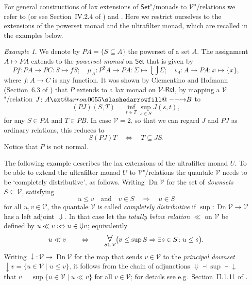 \documentclass[preprint, a4paper]{elsarticle}
\makeatletter
\def\slashedarrowfill@#1#2#3#4#5{%
  $\m@th\thickmuskip0mu\medmuskip\thickmuskip\thinmuskip\thickmuskip
   \relax#5#1\mkern-7mu%
   \cleaders\hbox{$#5\mkern-2mu#2\mkern-2mu$}\hfill
   \mathclap{#3}\mathclap{#2}%
   \cleaders\hbox{$#5\mkern-2mu#2\mkern-2mu$}\hfill
   \mkern-7mu#4$%
}
\def\rightslashedarrowfill@{%
  \slashedarrowfill@\relbar\relbar\mapstochar\rightarrow}
\newcommand\xslashedrightarrow[2][]{%
  \ext@arrow 0055{\rightslashedarrowfill@}{#1}{#2}}
\def\slashedrightarrow{\xslashedrightarrow{}}
\theoremstyle{definition}
\theoremstyle{remark}
\newtheorem{example}[theorem]{Example}
\newcommand\defeq{\mathrel{\vcentcolon\Leftrightarrow}}
\renewcommand{\implies}{\Rightarrow}
\renewcommand{\iff}{\Leftrightarrow}
\providecommand{\brcs}[1]{\lbrace #1 \rbrace}
\providecommand{\bigpars}[1]{\bigl(#1\bigr)}
\providecommand{\set}[1]{\brcs{#1}}
\providecommand{\Union}{\bigcup}
\DeclareMathOperator\ForallOp{\mbox{\Large $\mathsurround0pt\forall$}}
\newcommand\Forall{\ForallOp\displaylimits}
\DeclareMathOperator{\Dn}{Dn}
\providecommand{\map}[3]{#1\colon#2\to#3}
\providecommand{\hmap}[3]{#1\colon#2\slashedrightarrow#3}
\providecommand{\ladj}{\dashv}
\providecommand{\catvar}[1]{\mathcal{#1}}
\providecommand{\2}{\mathsf 2}
\providecommand{\V}{\catvar V}
\providecommand{\Set}{\mathsf{Set}}
\providecommand{\Rel}{\mathsf{Rel}}
\providecommand{\enRel}[1]{#1\text-\Rel}
\makeatother
\begin{document}
  For general constructions of lax extensions of $\Set$"/monads to $\V$"/relations we refer to \cite{Clementino-Hofmann04} (or see Section~IV.2.4 of \cite{Hofmann-Seal-Tholen14}) and \cite{Seal05}. Here we restrict ourselves to the extensions of the powerset monad and the ultrafilter monad, which are recalled in the examples below. 
  \begin{example} \label{powerset monad}
  	We denote by $PA = \set{S \subseteq A}$ the powerset of a set $A$. The assignment $A \mapsto PA$ extends to the \emph{powerset monad} on $\Set$ that is given by
		\begin{displaymath}
			\map{Pf}{PA}{PC}\colon S \mapsto fS; \quad\! \map{\mu_A}{P^2A}{PA}\colon \Sigma \mapsto \Union \Sigma; \quad\! \map{\iota_A}A{PA}\colon x \mapsto \set{x},
		\end{displaymath}
		where $\map fAC$ is any function. It was shown by Clementino and Hofmann (Section~6.3 of \cite{Clementino-Hofmann04}) that $P$ extends to a lax monad on $\enRel\V$, by mapping a $\V$"/relation $\hmap JAB$ to
		\begin{displaymath}
			(PJ)(S, T) = \inf_{t \in T}\sup_{s \in S} J(s, t),
		\end{displaymath}
		for any $S \in PA$ and $T \in PB$. In case $\V = 2$, so that we can regard $J$ and $PJ$ as ordinary relations, this reduces to
		\begin{displaymath}
			S (PJ) T \quad \iff \quad T \subseteq JS.
		\end{displaymath}
		Notice that $P$ is not normal.
  \end{example}
  
  The following example describes the lax extensions of the ultrafilter monad $U$. To be able to extend the ultrafilter monad $U$ to $\V$"/relations the quantale $\V$ needs to be `completely distributive', as follows. Writing $\Dn\V$ for the set of \emph{downsets} $S \subseteq \V$, satisfying
  \begin{displaymath}
  	u \leq v \quad \text{and} \quad v \in S \quad \implies \quad u \in S
  \end{displaymath}
  for all $u, v \in \V$, the quantale $\V$ is called \emph{completely distributive} if $\map{\sup}{\Dn\V}\V$ has a left adjoint $\Downarrow$. In that case let the \emph{totally below relation} $\ll$ on $\V$ be defined by $u \ll v \defeq u \in {\Downarrow} v$; equivalently
	\begin{displaymath}
		u \ll v \qquad \iff \qquad \Forall\displaylimits_{S \subseteq \V} \bigpars{v \leq \sup S \implies \exists s \in S\colon u \leq s}.
	\end{displaymath}
	Writing $\map{\downarrow}\V{\Dn\V}$ for the map that sends $v \in \V$ to the \emph{principal downset} ${\downarrow}v = \set{u \in \V \mid u \leq v}$, it follows from the chain of adjunctions ${\Downarrow} \ladj \sup \ladj {\downarrow}$ that $v = \sup\set{u \in \V \mid u \ll v}$ for all $v \in \V$; for details see e.g.\ Section~II.1.11 of \cite{Hofmann-Seal-Tholen14}.
	
\end{document}

